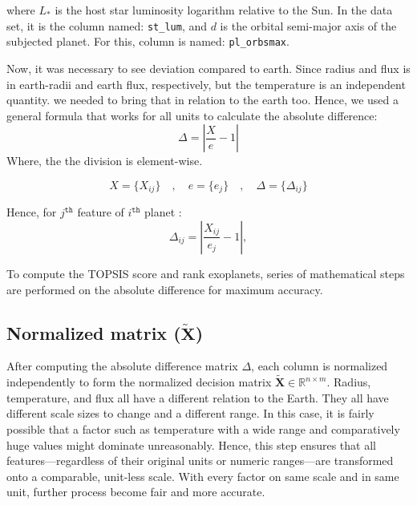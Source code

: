 \documentclass[12pt]{article}
\begin{document}
where $L_*$ is the host star luminosity logarithm relative to the Sun. In the data set, it is the column named: \texttt{st\_lum}, and $d$ is the orbital semi-major axis of the subjected planet. For this, column is named: \texttt{pl\_orbsmax}.


Now, it was necessary to see deviation compared to earth. Since radius and flux is in earth-radii and earth flux, respectively, but the temperature is an independent quantity. we needed to bring that in relation to the earth too. Hence, we used a general formula that works for all units to calculate the absolute difference:\vspace{1em}
\begin{equation}\label{eq:diff}
  \Delta = \left| \frac{{X}}{{e}} - 1 \right|
\end{equation}
\vspace{1em}
Where, the the division is element-wise.

\begin{equation*}
    X=\{ X_{ij} \} \quad , \quad  e=\{ e_{j} \} \quad , \quad \Delta=\{ \Delta_{ij} \} 
\end{equation*}\vspace{1em}

Hence, for $j^{\texttt{th}}$ feature of $i^{\texttt{th}}$ planet :\vspace{1em}
\begin{equation}
  \Delta_{ij} = \left| \frac{{X}_{ij}}{{e_{j}}} - 1 \right|,
\end{equation}


\vspace{1em}To compute the TOPSIS score and rank exoplanets, series of mathematical steps are performed on the absolute difference for maximum accuracy.\vspace{2em}

\subsection{Normalized matrix ($\tilde{\mathbf{X}}$)}\label{subsec:normlized matrix}
After computing the absolute difference matrix $\Delta$, each column is normalized independently to form the normalized decision matrix $\tilde{\mathbf{X}} \in \mathbb{R}^{n \times m}$. Radius, temperature, and flux all have a different relation to the Earth. They all have different scale sizes to change and a different range. In this case, it is fairly possible that a factor such as temperature with a wide range and comparatively huge values might dominate unreasonably. Hence, this step ensures that all features—regardless of their original units or numeric ranges—are transformed onto a comparable, unit-less scale. With every factor on same scale and in same unit, further process become fair and more accurate.
\end{document}
